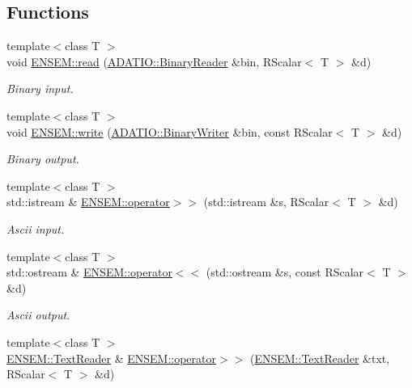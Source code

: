 \subsection*{Functions}
\begin{DoxyCompactItemize}
\item 
{\footnotesize template$<$class T $>$ }\\void \mbox{\hyperlink{group__rscalar_gaccfe83f3d505a988121c117c9383f188}{E\+N\+S\+E\+M\+::read}} (\mbox{\hyperlink{classADATIO_1_1BinaryReader}{A\+D\+A\+T\+I\+O\+::\+Binary\+Reader}} \&bin, R\+Scalar$<$ T $>$ \&d)
\begin{DoxyCompactList}\small\item\em Binary input. \end{DoxyCompactList}\item 
{\footnotesize template$<$class T $>$ }\\void \mbox{\hyperlink{group__rscalar_ga22fa002fd1c18dfe5d521aef45102477}{E\+N\+S\+E\+M\+::write}} (\mbox{\hyperlink{classADATIO_1_1BinaryWriter}{A\+D\+A\+T\+I\+O\+::\+Binary\+Writer}} \&bin, const R\+Scalar$<$ T $>$ \&d)
\begin{DoxyCompactList}\small\item\em Binary output. \end{DoxyCompactList}\item 
{\footnotesize template$<$class T $>$ }\\std\+::istream \& \mbox{\hyperlink{group__rscalar_ga20742b8ba8dde3fd2bb81883ac983c5f}{E\+N\+S\+E\+M\+::operator$>$$>$}} (std\+::istream \&s, R\+Scalar$<$ T $>$ \&d)
\begin{DoxyCompactList}\small\item\em Ascii input. \end{DoxyCompactList}\item 
{\footnotesize template$<$class T $>$ }\\std\+::ostream \& \mbox{\hyperlink{group__rscalar_ga362d60e2c1d2c88b747e44c6102f87db}{E\+N\+S\+E\+M\+::operator$<$$<$}} (std\+::ostream \&s, const R\+Scalar$<$ T $>$ \&d)
\begin{DoxyCompactList}\small\item\em Ascii output. \end{DoxyCompactList}\item 
{\footnotesize template$<$class T $>$ }\\\mbox{\hyperlink{classENSEM_1_1TextReader}{E\+N\+S\+E\+M\+::\+Text\+Reader}} \& \mbox{\hyperlink{group__rscalar_ga4ebc0db18feecd564535eb9b6011c854}{E\+N\+S\+E\+M\+::operator$>$$>$}} (\mbox{\hyperlink{classENSEM_1_1TextReader}{E\+N\+S\+E\+M\+::\+Text\+Reader}} \&txt, R\+Scalar$<$ T $>$ \&d)

\end{DoxyCompactItemize}
